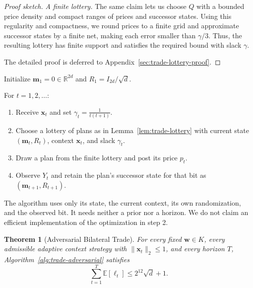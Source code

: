 \documentclass[11pt]{article}
\newtheorem{theorem}{Theorem}[section]
\newcommand{\E}[1]{\mathbb E\left[#1\right]}
\newcommand{\R}{\mathbb R}
\newcommand{\norm}[1]{\lVert #1\rVert_2}
\newcommand{\bm}{\boldsymbol m}
\newcommand{\bx}{\boldsymbol x}
\begin{document}
\begin{proof}[Proof sketch]
\emph{A finite lottery.} The same claim lets us choose $Q$ with a bounded price density and compact ranges of prices and successor states. Using this regularity and compactness, we round prices to a finite grid and approximate successor states by a finite net, making each error smaller than $\gamma/3$. Thus, the resulting lottery has finite support and satisfies the required bound with slack $\gamma$. 

The detailed proof is deferred to Appendix~\ref{sec:trade-lottery-proof}. \end{proof}


\begin{algorithm}[H]
\caption{Adversarial Contextual Bilateral Trade}\label{alg:trade-adversarial}
\vspace{3pt}
Initialize $\bm_1=0\in\R^{2d}$ and $R_1=I_{2d}/\sqrt d$.

For $t=1,2,\ldots$:
\begin{enumerate}
 \item Receive $\bx_t$ and set $\gamma_t=\tfrac{1}{t(t+1)}$.
 \item Choose a {lottery of plans} as in Lemma~\ref{lem:trade-lottery} with current state $(\bm_t,R_t)$, context $\bx_t$, and slack $\gamma_t$.
 \item Draw a plan from the finite lottery and post its price $p_t$. 
 \item Observe $Y_t$ and retain the plan's successor state for that bit as $(\bm_{t+1},R_{t+1})$.
\end{enumerate}
\end{algorithm}

The algorithm uses only its state, the current context, its own randomization, and the observed bit. It needs neither a prior nor a horizon. {We do} not claim an efficient implementation of the optimization in step 2.

\begin{theorem}[Adversarial Bilateral Trade]\label{thm:trade-direct}
For every fixed $\boldsymbol w\in K$, every admissible adaptive context strategy with $\norm{\bx_t}\le1$, and every horizon $T$, Algorithm~\ref{alg:trade-adversarial} satisfies
\begin{equation}\label{eq:trade-direct-guarantee}
 \sum_{t=1}^T\E{\ell_t}\le2^{12}\sqrt d+1.
\end{equation}
\end{theorem}
\end{document}
